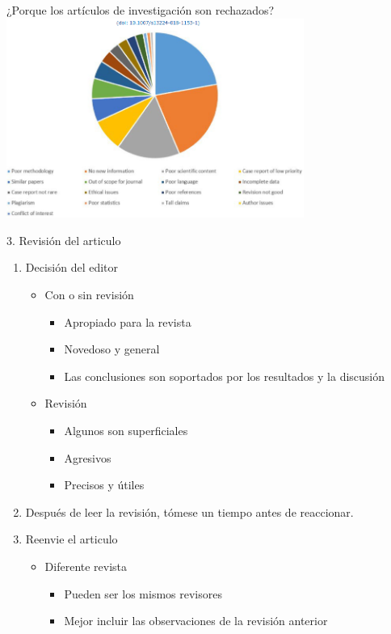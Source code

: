 \documentclass[
10pt,
aspectratio=169,
]{beamer}
\begin{document}
\begin{frame}{¿Porque los artículos de investigaci\'on son rechazados?}
\centering
\includegraphics[width=0.73\textwidth]{fi3.png}
\end{frame}

\begin{frame}{3. Revisi\'on del articulo}
\begin{enumerate}
\item Decisión del editor
\begin{itemize}
\item Con o sin revisión
\begin{itemize}
\item Apropiado para la revista
\item Novedoso y general
\item Las conclusiones son soportados por los resultados y la discusión
\end{itemize}
\item Revisión
\begin{itemize}
\item Algunos son superficiales
\item Agresivos
\item Precisos y útiles
\end{itemize}
\end{itemize}
\item Después de leer la revisi\'on, tómese un tiempo antes de reaccionar.
\item Reenvie el articulo 
\begin{itemize}
\item Diferente revista
\begin{itemize}
\item Pueden ser los mismos revisores
\item Mejor incluir las observaciones de la revisión anterior
\end{itemize}
\end{itemize}
\end{enumerate}
\end{frame}
\end{document}
